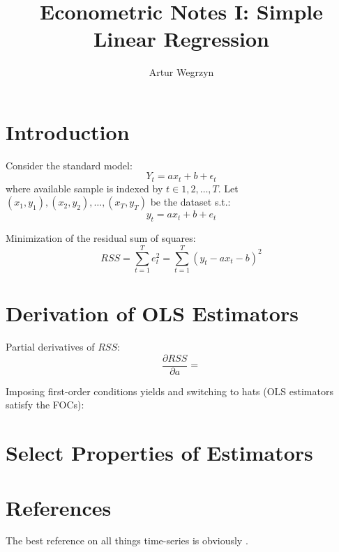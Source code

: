 \documentclass[12pt]{article}
\begin{document}
\title{Econometric Notes I: Simple Linear Regression}
\author{Artur Wegrzyn}
\maketitle


\tableofcontents


\section{Introduction}

Consider the standard model:
\begin{equation}
Y_t = a x_t + b +\epsilon_t
\end{equation}
where available sample is indexed by $t \in {1, 2, \dots, T}$.
Let ${(x_1, y_1), (x_2, y_2), \dots, (x_T, y_T)}$ be the dataset s.t.:
\begin{equation}
y_t = a x_t + b + e_t
\end{equation}

Minimization of the residual sum of squares:
\begin{equation}
RSS = \sum_{t=1}^{T} e_t^2 = \sum_{t=1}^{T}(y_t - a x_t - b)^2
\end{equation}

\section{Derivation of OLS Estimators}
Partial derivatives of $RSS$:
\begin{equation}
\frac{\partial RSS}{\partial a} = 
\end{equation}

Imposing first-order conditions yields and switching to hats (OLS estimators satisfy the FOCs):


\section{Select Properties of Estimators}


\section{References}
The best reference on all things time-series is obviously \cite{hamilton_tsa}. 




\end{document}
